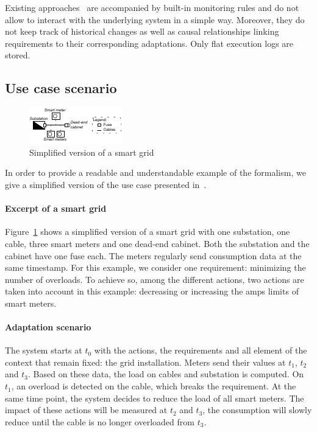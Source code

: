 Existing approaches~\cite{hassel13,DBLP:conf/models/HeinrichSJRMHRP14,DBLP:conf/icac/EhlersHWH11,DBLP:conf/icse/MendoncaAR14,DBLP:conf/icse/CasanovaGSA14,DBLP:conf/icse/IftikharW14a} are accompanied by built-in monitoring rules and do not allow to interact with the underlying system in a simple way. 
Moreover, they do not keep track of historical changes as well as causal relationships linking requirements to their corresponding adaptations. Only flat execution logs are stored. 

\subsection{Use case scenario}
\label{sec:tkm:intro:uc}

\begin{figure}
	\centering
	\includegraphics[width=0.7\linewidth]{img/chapt-tkm/formalism/excerptSG}
	\caption{Simplified version of a smart grid}
	\label{fig:tkm:excerptSG}
\end{figure}

In order to provide a readable and understandable example of the formalism, we give a simplified version of the use case presented in~.

\paragraph{Excerpt of a smart grid}
Figure~\ref{fig:tkm:excerptSG} shows a simplified version of a smart grid with one substation, one cable, three smart meters and one dead-end cabinet.
Both the substation and the cabinet have one fuse each.
The meters regularly send consumption data at the same timestamp.
For this example, we consider one requirement: minimizing the number of overloads.
To achieve so, among the different actions, two actions are taken into account in this example: decreasing or increasing the amps limits of smart meters.

\paragraph{Adaptation scenario}
The system starts at $t_0$ with the actions, the requirements and all element of the context that remain fixed: the grid installation.
Meters send their values at $t_1$, $t_2$ and $t_3$.
Based on these data, the load on cables and substation is computed.
On $t_1$, an overload is detected on the cable, which breaks the requirement.
At the same time point, the system decides to reduce the load of all smart meters.
The impact of these actions will be measured at $t_2$ and $t_3$, \ie the consumption will slowly reduce until the cable is no longer overloaded from $t_3$.

